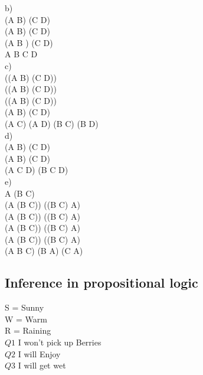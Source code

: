 \documentclass{article}
\begin{document}
b)\\
\neg (A \Rightarrow \neg B) \wedge \neg (C \Rightarrow \neg D)\\
\neg (\neg A \vee \neg B) \wedge \neg (\neg C \vee \neg D)\\
(A \wedge B ) \wedge (C \wedge D)\\
A \wedge B \wedge C \wedge D\\

c)\\
\neg ((A \Rightarrow B) \wedge (C \Rightarrow D))\\
\neg ((\neg A \vee B) \wedge (\neg C \vee D))\\
(\neg (\neg A \vee B) \vee \neg(\neg C \vee D))\\
(A \wedge \neg B) \vee (C \wedge \neg D)\\
(A \vee C) \wedge (A \vee \neg D) \wedge (\neg B \vee C) \wedge (\neg B \vee \neg D)\\

d)\\
(A \wedge B) \vee (C \Rightarrow D)\\
(A \wedge B) \vee (\neg C \vee D)\\
(A \vee \neg C \vee D) \wedge (B \vee \neg C \vee D)\\

e)\\
A \Leftrightarrow (B \Rightarrow \neg C)\\
(A \Rightarrow (B \Rightarrow \neg C)) \wedge ((B \Rightarrow \neg C) \Rightarrow A)\\
(\neg A \vee (B \Rightarrow \neg C)) \wedge (\neg (B \Rightarrow \neg C) \vee A)\\
(\neg A \vee (\neg B \vee \neg C)) \wedge (\neg (\neg B \vee \neg C) \vee A)\\
(\neg A \vee (\neg B \vee \neg C)) \wedge ((B \wedge C) \vee A)\\
(\neg A \vee \neg B \vee \neg C) \wedge (B \vee A) \wedge (C \vee A)\\

\subsection{Inference in propositional logic}

\noindent S = Sunny\\
W = Warm\\
R = Raining\\


\noindent $Q1$ I won’t pick up Berries\\
$Q2$ I will Enjoy\\
$Q3$ I will get wet\\
\end{document}
